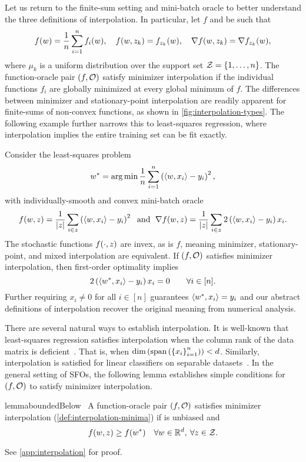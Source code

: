 Let us return to the finite-sum setting and mini-batch oracle to better understand the three definitions of interpolation.
In particular, let \( f \) and \oracle{} be such that
\[ f(\w) =  \frac{1}{n} \sum_{i=1}^{n} f_i(\w), \quad f(\w, \zk) = f_{\zk}(\w), \quad \grad(\w, \zk) = \grad_{\zk}(\w),  \]
where \( \mu_k \) is a uniform distribution over the support set \( \calZ = \cbr{1, \ldots, n} \).
The function-oracle pair \( \rbr{f, \oracle{}} \) satisfy minimizer interpolation if the individual functions \( f_i \) are globally minimized at every global minimum of \( f \).
The differences between minimizer and stationary-point interpolation are readily apparent for finite-sums of non-convex functions, as shown in \autoref{fig:interpolation-types}.
The following example further narrows this to least-squares regression, where interpolation implies the entire training set can be fit exactly.
\begin{example}\label{example:ls-interpolation}
    Consider the least-squares problem 
    \[ \wopt = \argmin \frac{1}{n} \sum_{i=1}^n \rbr{\abr{w, x_i} - y_i}^2, \]
    with individually-smooth and convex mini-batch oracle
    \[ f(\w, \z) = \frac{1}{|\z|} \sum_{i \in \z}  \rbr{\abr{w, x_i} - y_i}^2 \; \text{ and } \; \grad(\w, \z) = \frac{1}{|\z|} \sum_{i \in \z} 2 \rbr{\abr{w, x_i} - y_i} x_i. \]
    The stochastic functions \( f(\cdot, \z) \) are invex, as is \( f \), meaning minimizer, stationary-point, and mixed interpolation are equivalent. 
    If \( \rbr{f, \oracle} \) satisfies minimizer interpolation, then first-order optimality implies 
    \[  2 \rbr{\abr{\wopt, x_i} - y_i} x_i = 0 \quad \quad \forall i \in [n]. \] 
    Further requiring \( x_i \neq 0 \) for all \( i \in [n] \) guarantees \( \abr{\wopt, x_i} = y_i \) and our abstract definitions of interpolation recover the original meaning from numerical analysis.  
\end{example}

There are several natural ways to establish interpolation.
It is well-known that least-squares regression satisfies interpolation when the column rank of the data matrix is deficient~\citep{hastie2009elements}.
That is, when \( \text{dim}\rbr{\text{span}\rbr{\cbr{x_i}_{i=1}^n}} < d \). 
Similarly, interpolation is satisfied for linear classifiers on separable datasets~\citep{vaswani2019fast}. 
In the general setting of \acp{SFO}, the following lemma establishes simple conditions for \( \rbr{f, \oracle{}} \) to satisfy minimizer interpolation.
\begin{restatable}{lemma}{boundedBelow}~\label{lemma:bounded-below}
    A function-oracle pair \( \rbr{f, \oracle{}} \) satisfies minimizer interpolation (\autoref{def:interpolation-minima}) if \oracle{} is unbiased and 
    \[ f(\w, \z ) \geq f(\wopt) \quad \forall \w \in \R^d, \: \forall \z \in \calZ. \]
\end{restatable}
\noindent See \autoref{app:interpolation} for proof.\hfill \break

